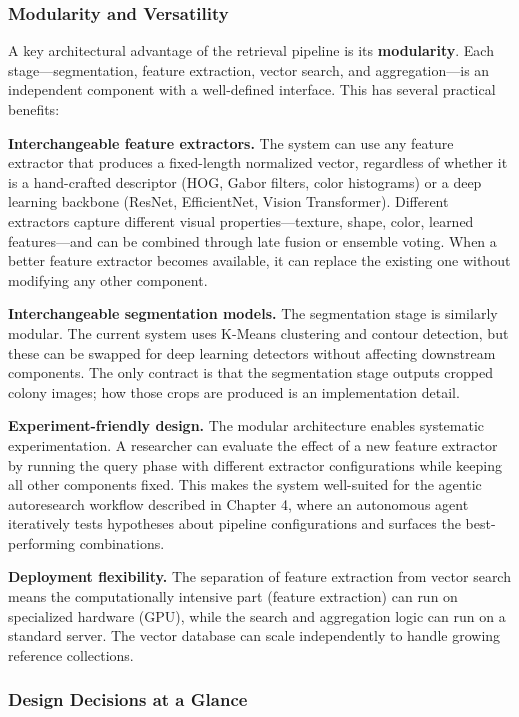 \subsubsection{Modularity and Versatility}\label{modularity-and-versatility}

A key architectural advantage of the retrieval pipeline is its \textbf{modularity}. Each stage---segmentation, feature extraction, vector search, and aggregation---is an independent component with a well-defined interface. This has several practical benefits:

\textbf{Interchangeable feature extractors.} The system can use any feature extractor that produces a fixed-length normalized vector, regardless of whether it is a hand-crafted descriptor (HOG, Gabor filters, color histograms) or a deep learning backbone (ResNet, EfficientNet, Vision Transformer). Different extractors capture different visual properties---texture, shape, color, learned features---and can be combined through late fusion or ensemble voting. When a better feature extractor becomes available, it can replace the existing one without modifying any other component.

\textbf{Interchangeable segmentation models.} The segmentation stage is similarly modular. The current system uses K-Means clustering and contour detection, but these can be swapped for deep learning detectors without affecting downstream components. The only contract is that the segmentation stage outputs cropped colony images; how those crops are produced is an implementation detail.

\textbf{Experiment-friendly design.} The modular architecture enables systematic experimentation. A researcher can evaluate the effect of a new feature extractor by running the query phase with different extractor configurations while keeping all other components fixed. This makes the system well-suited for the agentic autoresearch workflow described in Chapter 4, where an autonomous agent iteratively tests hypotheses about pipeline configurations and surfaces the best-performing combinations.

\textbf{Deployment flexibility.} The separation of feature extraction from vector search means the computationally intensive part (feature extraction) can run on specialized hardware (GPU), while the search and aggregation logic can run on a standard server. The vector database can scale independently to handle growing reference collections.

\subsubsection{Design Decisions at a Glance}\label{design-decisions-at-a-glance}

